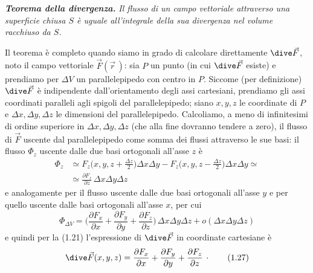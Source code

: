 \textbf{\textit{Teorema della divergenza.}} \textit{Il flusso di un campo
vettoriale attraverso una superficie chiusa $S$ \`e uguale all'integrale della
sua divergenza nel volume racchiuso da $S$.}

Il teorema \`e completo quando siamo in grado di calcolare direttamente
$\dive\vec F$, noto il campo vettoriale $\vec F(\vec r\,)$: sia $P$ un punto (in
cui $\dive\vec F$ esiste) e prendiamo per $\Delta V$ un parallelepipedo con
centro in $P$. Siccome (per definizione) $\dive\vec F$ \`e indipendente
dall'orientamento degli assi cartesiani, prendiamo gli assi coordinati paralleli
agli spigoli del parallelepipedo; siano $x,y,z$ le coordinate di $P$ e
$\Delta x,\Delta y,\Delta z$ le dimensioni del parallelepipedo. Calcoliamo, a
meno di infinitesimi di ordine superiore in $\Delta x,\Delta y,\Delta z$ (che
alla fine dovranno tendere a zero), il flusso di $\vec F$ uscente dal
parallelepipedo come somma dei flussi attraverso le sue basi: il flusso $\Phi_z$
uscente dalle due basi ortogonali all'asse $z$ \`e
\begin{equation}
  \begin{split}
    \Phi_z&\simeq F_z\Big(x,y,z+\frac{\Delta z}{2}\Big)\Delta x\Delta y
    -F_z\Big(x,y,z-\frac{\Delta z}{2}\Big)\Delta x\Delta y\simeq\\
    &\simeq\frac{\partial F_z}{\partial z}\,\Delta x\Delta y\Delta z
  \end{split}
  \tag{1.25}
\end{equation}
e analogamente per il flusso uscente dalle due basi ortogonali all'asse $y$ e
per quello uscente dalle basi ortogonali all'asse $x$, per cui
\begin{equation}
  \Phi_{\Delta V}=\Big(\frac{\partial F_x}{\partial x}
  +\frac{\partial F_y}{\partial y}+\frac{\partial F_z}{\partial z}\Big)
  \,\Delta x\Delta y\Delta z+o(\Delta x\Delta y\Delta z)
  \tag{1.26}
\end{equation}
e quindi per la (1.21) l'espressione di $\dive\vec F$ in coordinate cartesiane
\`e
\begin{equation}
  \dive\vec F(x,y,z)=\frac{\partial F_x}{\partial x}
  +\frac{\partial F_y}{\partial y}+\frac{\partial F_z}{\partial z}\,\cdot
  \tag{1.27}
\end{equation}

